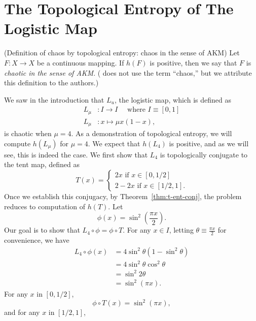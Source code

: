 \documentclass[12pt,twoside,draft]{book}
\begin{document}
\section{The Topological Entropy of The Logistic Map}
\begin{definition}
  (Definition of chaos by topological entropy: chaos in the sense of AKM) 
  Let $F: X \to X$ be a continuous mapping.
  If $h(F)$ is positive, then we say that $F$ is \textit{chaotic in the sense of AKM}.
  (\citet{akm} does not use the term ``chaos,'' but we attribute this definition to the authors.)
\end{definition}
We saw in the introduction that $L_u$, the logistic map, which is defined as
\begin{align*}
  L_\mu&: I \to I \quad\mbox{ where } I \equiv [0,1] \\
  L_\mu&: x \mapsto \mu x (1-x),
\end{align*}
is chaotic when $\mu = 4$.
As a demonstration of topological entropy, we will compute $h(L_\mu)$ for $\mu = 4$.
We expect that $h(L_4)$ is positive, and as we will see, this is indeed the case. 
We first show that $L_4$ is topologically conjugate to the tent map, defined as
\begin{equation*}
  T(x) = 
  \begin{cases}
    2x \mbox{ if } x \in [0,1/2] \\
    2 - 2x \mbox{ if } x \in [1/2,1].
  \end{cases}
\end{equation*}
Once we establish this conjugacy, by Theorem~\ref{thm:t-ent-conj}, the problem reduces to computation of $h(T)$.
Let
\begin{equation*}
  \phi(x) = \sin^2(\frac{\pi x}{2}).
\end{equation*}
Our goal is to show that $L_4 \circ \phi = \phi \circ T$.
For any $x \in I$, letting $\theta \equiv \frac{\pi x}{2}$ for convenience, we have
\begin{align*}
   L_4 \circ \phi(x)
   &= 4\sin^2\theta(1 - \sin^2\theta) \\
   &= 4\sin^2\theta \cos^2\theta \\
   &= \sin^2 2\theta \\
   &= \sin^2 (\pi x).
\end{align*}
For any $x$ in $[0,1/2]$,
\begin{equation*}
  \phi \circ T(x)
  = \sin^2(\pi x),
\end{equation*}
and for any $x$ in $[1/2,1]$,
\end{document}
